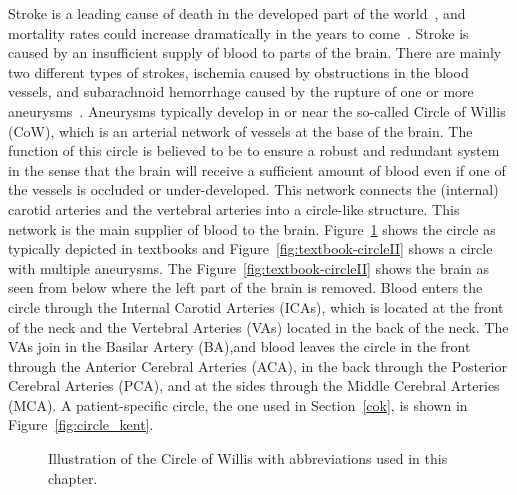 Stroke is a leading cause of death in the developed part of the
world~\cite{feigin}, and mortality rates could increase dramatically
in the years to come~\cite{murray}. Stroke is caused by an
insufficient supply of blood to parts of the brain. There are mainly
two different types of strokes, ischemia caused by obstructions in the
blood vessels, and subarachnoid hemorrhage caused by the rupture of
one or more aneurysms~\cite{humphrey}. Aneurysms typically develop in
or near the so-called Circle of Willis (CoW), which is an arterial
network of vessels at the base of the brain. The function of this
circle is believed to be to ensure a robust and redundant system in
the sense that the brain will receive a sufficient amount of blood
even if one of the vessels is occluded or under-developed. This
network connects the (internal) carotid arteries and the vertebral
arteries into a circle-like structure. This network is the main
supplier of blood to the brain. Figure~\ref{fig:textbook-circle} shows
the circle as typically depicted in textbooks and
Figure~\ref{fig:textbook-circleII} shows a circle with multiple
aneurysms. The Figure~\ref{fig:textbook-circleII} shows the brain as
seen from below where the left part of the brain is removed. Blood
enters the circle through the Internal Carotid Arteries (ICAs), which
is located at the front of the neck and the Vertebral Arteries (VAs)
located in the back of the neck.  The VAs join in the Basilar Artery
(BA),and blood leaves the circle in the front through the Anterior
Cerebral Arteries (ACA), in the back through the Posterior Cerebral
Arteries (PCA), and at the sides through the Middle Cerebral Arteries
(MCA). A patient-specific circle, the one used in Section~\ref{cok},
is shown in Figure~\ref{fig:circle_kent}.

\begin{figure}
  \begin{center}
  \end{center}
  \caption{Illustration of the Circle of Willis with abbreviations used in this chapter.}
  \label{fig:textbook-circle}
\end{figure}

